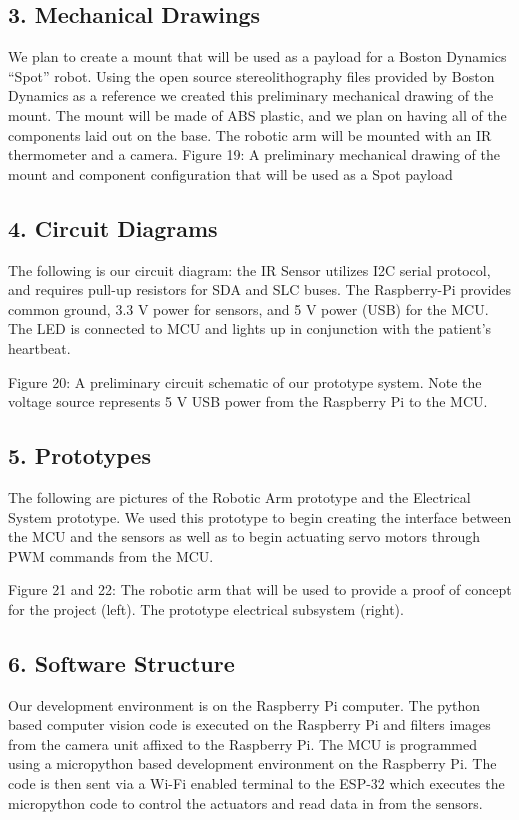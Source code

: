 ﻿\documentclass[10pt]{article}
\begin{document}
\subsection{3. Mechanical Drawings}
We plan to create a mount that will be used as a payload for a Boston Dynamics ``Spot'' robot. Using the open source stereolithography files provided by Boston Dynamics as a reference we created this preliminary mechanical drawing of the mount. The mount will be made of ABS plastic, and we plan on having all of the components laid out on the base. The robotic arm will be mounted with an IR thermometer and a camera.
Figure 19: A preliminary mechanical drawing of the mount and component configuration that will be used as a Spot payload
   
\subsection{4. Circuit Diagrams}
The following is our circuit diagram: the IR Sensor utilizes I2C serial protocol, and requires pull-up resistors for SDA and SLC buses. The Raspberry-Pi provides common ground, 3.3 V power for sensors, and 5 V power (USB) for the MCU. The LED is connected to MCU and lights up in conjunction with the patient’s heartbeat. 
  

Figure 20: A preliminary circuit schematic of our prototype system. Note the voltage source represents 5 V USB power from the Raspberry Pi to the MCU.

\subsection{5. Prototypes}
The following are pictures of the Robotic Arm prototype and the Electrical System prototype. We used this prototype to begin creating the interface between the MCU and the sensors as well as to begin actuating servo motors through PWM commands from the MCU.

Figure 21 and 22: The robotic arm that will be used to provide a proof of concept for the project (left). The prototype electrical subsystem (right). 

\subsection{6. Software Structure}
Our development environment is on the Raspberry Pi computer. The python based computer vision code is executed on the Raspberry Pi and filters images from the camera unit affixed to the Raspberry Pi. The MCU is programmed using a micropython based development environment on the Raspberry Pi. The code is then sent via a Wi-Fi enabled terminal to the ESP-32 which executes the micropython code to control the actuators and read data in from the sensors. 
\end{document}
